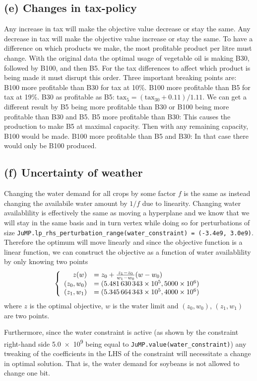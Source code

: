 \documentclass{article}
\begin{document}
\subsection{(e) Changes in tax-policy}
Any increase in tax will make the objective value decrease or stay the same. 
Any decrease in tax will make the objective value increase or stay the same. 
To have a difference on which products we make, the most profitable product per litre must change. 
With the original data the optimal usage of vegetable oil is making B30, followed by B100, and then B5. 
For the tax differences to affect which product is being made it must disrupt this order. 
Three important breaking points are: 
B100 more profitable than B30 for tax at 10\%. 
B100 more profitable than B5 for tax at 19\%. 
B30 as profitable as B5: $\textrm{tax}_5 = (\textrm{tax}_{30} + 0.11)/1.11$.
We can get a different result by B5 being more profitable than B30 or B100 being more profitable than B30 and B5. 
B5 more profitable than B30: This causes the production to make B5 at maximal capacity.  
Then with any remaining capacity, B100 would be made. 
B100 more profitable than B5 and B30: In that case there would only be B100 produced. 

\subsection{(f) Uncertainty of weather}\label{sec:3f}
Changing the water demand for all crops by some factor $f$
is the same as instead changing the availabile water amount
by $1/f$ due to linearity.
Changing water availablility is effectively the same as moving a hyperplane
and we know that we will stay in the same basis and in turn vertex
while doing so for perturbations of size
\verb+JuMP.lp_rhs_perturbation_range(water_constraint) = (-3.4e9, 3.0e9)+.
Therefore the optimum will move linearly
and since the objective function is a linear function,
we can construct the objective as a function of water availablility
by only knowing two points
$$ \left\{ \begin{array}{r l}
	z(w) &= z_0 + \frac{z_1 - z_0}{w_1 - w_0} (w - w_0) \\
	(z_0, w_0) &= (\num{5.481630343e+05}, \num{5000e6}) \\
	(z_1, w_1) &= (\num{5.345664343e+05}, \num{4000e6})
\end{array} \right.
	$$
where $z$ is the optimal objective, $w$ is the water limit
and $(z_0, w_0)$, $(z_1, w_1)$ are two points.

Furthermore, since the water constraint is active
(as shown by the constraint right-hand side \num{5.0e9} being equal to
\verb+JuMP.value(water_constraint)+)
any tweaking of the coefficients in the LHS of the constraint
will necessitate a change in optimal solution.
That is, the water demand for soybeans is not allowed to change one bit.
\end{document}
